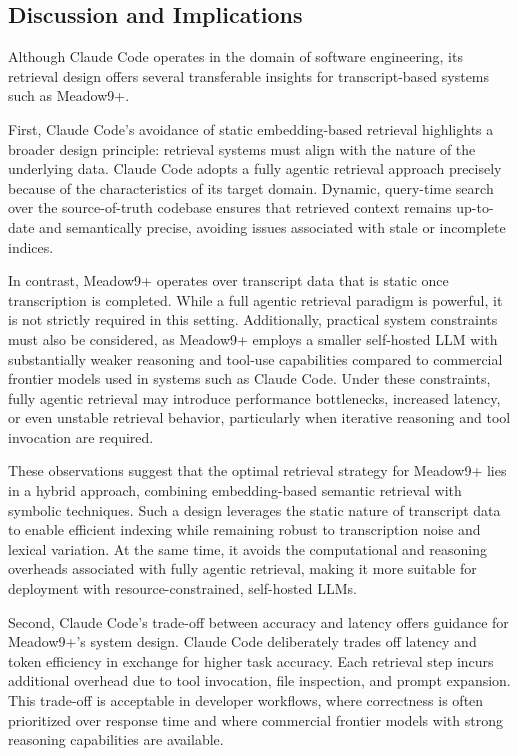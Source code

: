\subsection{Discussion and Implications}
Although Claude Code operates in the domain of software engineering, its retrieval design offers several transferable insights for transcript-based systems such as Meadow9+.

First, Claude Code’s avoidance of static embedding-based retrieval highlights a broader design principle: retrieval systems must align with the nature of the underlying data. Claude Code adopts a fully agentic retrieval approach precisely because of the characteristics of its target domain. Dynamic, query-time search over the source-of-truth codebase ensures that retrieved context remains up-to-date and semantically precise, avoiding issues associated with stale or incomplete indices.

In contrast, Meadow9+ operates over transcript data that is static once transcription is completed. While a full agentic retrieval paradigm is powerful, it is not strictly required in this setting. Additionally, practical system constraints must also be considered, as Meadow9+ employs a smaller self-hosted LLM with substantially weaker reasoning and tool-use capabilities compared to commercial frontier models used in systems such as Claude Code. Under these constraints, fully agentic retrieval may introduce performance bottlenecks, increased latency, or even unstable retrieval behavior, particularly when iterative reasoning and tool invocation are required.

These observations suggest that the optimal retrieval strategy for Meadow9+ lies in a hybrid approach, combining embedding-based semantic retrieval with symbolic techniques. Such a design leverages the static nature of transcript data to enable efficient indexing while remaining robust to transcription noise and lexical variation. At the same time, it avoids the computational and reasoning overheads associated with fully agentic retrieval, making it more suitable for deployment with resource-constrained, self-hosted LLMs.

Second, Claude Code’s trade-off between accuracy and latency offers guidance for Meadow9+’s system design. Claude Code deliberately trades off latency and token efficiency in exchange for higher task accuracy. Each retrieval step incurs additional overhead due to tool invocation, file inspection, and prompt expansion. This trade-off is acceptable in developer workflows, where correctness is often prioritized over response time and where commercial frontier models with strong reasoning capabilities are available.

